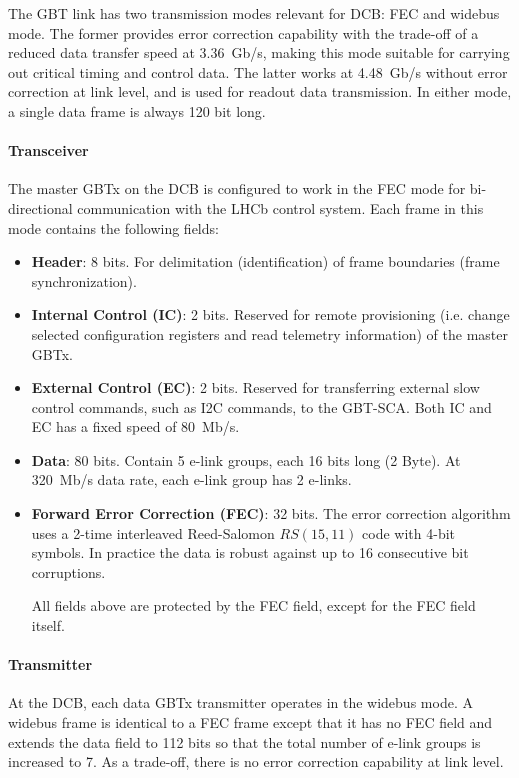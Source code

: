 The GBT link has two transmission modes relevant for DCB:
FEC and widebus mode.
The former provides error correction capability with the trade-off of a reduced
data transfer speed at 3.36~Gb/s,
making this mode suitable for carrying out critical timing and control data.
The latter works at 4.48~Gb/s without error correction at link level,
and is used for readout data transmission.
In either mode, a single data frame is always 120 bit long.

\paragraph{Transceiver}
The master GBTx on the DCB is configured to work in the FEC mode for
bi-directional communication with the LHCb control system.
Each frame in this mode contains the following fields:

\begin{itemize}
    \item \textbf{Header}:
        8 bits.
        For delimitation (identification) of frame boundaries
        (frame synchronization).

    \item \textbf{Internal Control (IC)}:
        2 bits.
        Reserved for remote provisioning
        (i.e. change selected configuration registers and read telemetry
        information) of the master GBTx.

    \item \textbf{External Control (EC)}:
        2 bits.
        Reserved for transferring external slow control commands,
        such as I2C commands, to the GBT-SCA.
        Both IC and EC has a fixed speed of 80~Mb/s.

    \item \textbf{Data}:
        80 bits.
        Contain 5 e-link groups, each 16 bits long (2 Byte).
        At 320~Mb/s data rate, each e-link group has 2 e-links.

    \item \textbf{Forward Error Correction (FEC)}:
        32 bits.
        The error correction algorithm uses a 2-time interleaved Reed-Salomon
        $RS(15, 11)$ code with 4-bit symbols.
        In practice the data is robust against up to 16 consecutive bit
        corruptions.

        All fields above are protected by the FEC field, except for the FEC
        field itself.
\end{itemize}

\paragraph{Transmitter}
At the DCB,
each data GBTx transmitter operates in the widebus mode.
A widebus frame is identical to a FEC frame except that it has no FEC field and
extends the data field to 112 bits so that the total number of e-link groups is
increased to 7.
As a trade-off, there is no error correction capability at link level.

